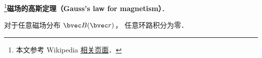 

\footnote{本文参考 Wikipedia \href{https://en.wikipedia.org/wiki/Gauss's_law_for_magnetism}{相关页面}．}\textbf{磁场的高斯定理（Gauss's law for magnetism）}．

对于任意磁场分布 $\bvec B(\bvec r)$， 任意环路积分为零．
